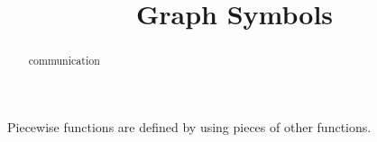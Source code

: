 \documentclass{ximera}
\title{Graph Symbols}
\begin{document}
\begin{abstract}
communication
\end{abstract}
\maketitle



Piecewise functions are defined by using pieces of other functions.
\end{document}
